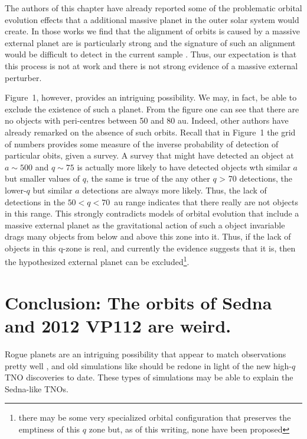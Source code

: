 \documentclass{aastex62}
\begin{document}
The authors of this chapter have already reported some of the problematic orbital evolution effects that a additional massive planet in the outer solar system would create.  In  those works we find that the alignment of orbits is caused by a massive external planet are is particularly strong \citep{shankman17}  and the signature of such an alignment would be difficult to detect in the current sample \citep{lawler17}.  Thus, our expectation is that this process is not at work and there is not strong evidence of a massive external perturber.

Figure~1, however, provides an intriguing possibility.  We may, in fact, be able to exclude the existence of such a planet. From the figure one can see that there are no objects with peri-centres between 50 and 80 au.  Indeed, other authors have already remarked on the absence of such orbits.  Recall that in Figure~1 the grid of numbers provides some measure of the inverse probability of detection of particular obits, given a survey.  A survey that might have detected an object at $a \sim 500$ and $q \sim75$ is actually more likely to have detected objects wth similar $a$ but smaller values of $q$, the same is true of the any other $q$ > 70 detections, the lower-$q$ but similar $a$ detections are always more likely.  Thus, the lack of detections in the $50 < q < 70$~au range indicates that there really are not objects in this range.  This strongly contradicts models of orbital evolution that include a massive external planet as the gravitational action of such a object invariable drags many objects from below and above this zone into it.  Thus, if the lack of objects in this q-zone is real, and currently the evidence suggests that it is, then the hypothesized external planet can be excluded\footnote{there may be some very specialized orbital configuration that preserves the emptiness of this  $q$ zone but, as of this writing, none have been proposed}.


\section{Conclusion: The orbits of Sedna and 2012 VP112 are weird.}

Rogue planets are an intriguing possibility that appear to match
observations pretty well \citep{lawler2018,silsbee18}, and old
simulations like \citet{gladmanchan06} should be redone in light of
the new high-$q$ TNO discoveries to date.  These types of simulations
may be able to explain the Sedna-like TNOs. 



% 



\end{document}
